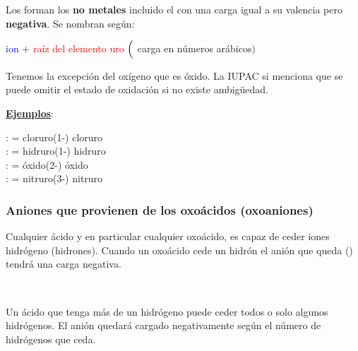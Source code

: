 \documentclass[12pt]{article}
\begin{document}
Los forman los \textbf{no metales} incluido el  con una carga igual a su valencia pero \textbf{negativa}. Se nombran según:

\begin{center}
    \textcolor{blue}{ion} + \textcolor{red}{raíz del elemento} \textcolor{red}{uro} $\Bigl($ \textcolor{mygreen}{carga en números arábicos}$\Bigr)$
\end{center}

Tenemos la excepción del oxígeno que es óxido. La IUPAC si menciona que se puede omitir el estado de oxidación si no existe ambigüedad.

\textbf{\uline{Ejemplos}}:

\noindent {} :  = cloruro(1-) \ch{->} cloruro\\
 :  = hidruro(1-)\ch{->} hidruro\\
 :  = óxido(2-) \ch{->} óxido\\
 :  = nitruro(3-) \ch{->} nitruro

\subsubsection{Aniones que provienen de los oxoácidos (oxoaniones)}


Cualquier ácido y en particular cualquier oxoácido, es capaz de ceder iones hidrógeno (hidrones). Cuando un oxoácido cede un hidrón el anión que queda () tendrá una carga negativa.
\begin{center}
    \\
\end{center}

Un ácido que tenga más de un hidrógeno puede ceder todos o solo algunos hidrógenos. El anión quedará cargado negativamente según el número de hidrógenos que ceda.

\begin{center}
    \\
    \\
    \\
    \\
    \\
\end{center}
\end{document}
